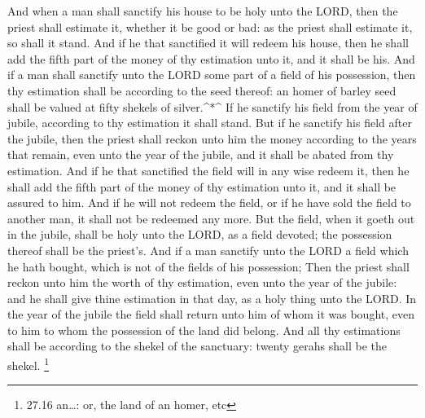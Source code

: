  And when a man shall sanctify his house to be holy unto
the LORD, then the priest shall estimate it, whether it be good or bad:
as the priest shall estimate it, so shall it stand.  And if
he that sanctified it will redeem his house, then he shall add the fifth
part of the money of thy estimation unto it, and it shall be his.
 And if a man shall sanctify unto the LORD some part of a
field of his possession, then thy estimation shall be according to the
seed thereof: an homer of barley seed shall be valued at fifty shekels
of silver.\^{}*\^{}  If he sanctify his field from the year
of jubile, according to thy estimation it shall stand.  But
if he sanctify his field after the jubile, then the priest shall reckon
unto him the money according to the years that remain, even unto the
year of the jubile, and it shall be abated from thy estimation.
 And if he that sanctified the field will in any wise
redeem it, then he shall add the fifth part of the money of thy
estimation unto it, and it shall be assured to him.  And if
he will not redeem the field, or if he have sold the field to another
man, it shall not be redeemed any more.  But the field,
when it goeth out in the jubile, shall be holy unto the LORD, as a field
devoted; the possession thereof shall be the priest's.  And
if a man sanctify unto the LORD a field which he hath bought, which is
not of the fields of his possession;  Then the priest shall
reckon unto him the worth of thy estimation, even unto the year of the
jubile: and he shall give thine estimation in that day, as a holy thing
unto the LORD.  In the year of the jubile the field shall
return unto him of whom it was bought, even to him to whom the
possession of the land did belong.  And all thy estimations
shall be according to the shekel of the sanctuary: twenty gerahs shall
be the shekel. \footnote{27.16 an\ldots: or, the land of an homer, etc}

